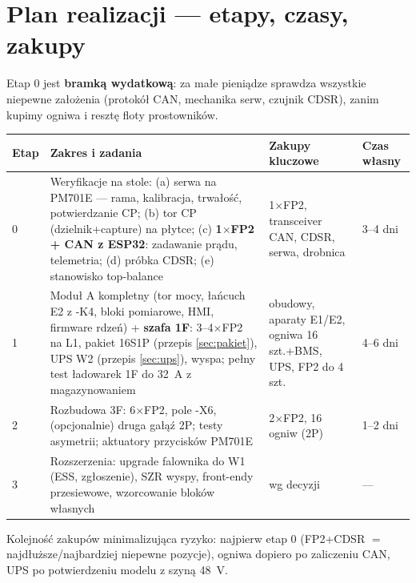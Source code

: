\documentclass[11pt,a4paper]{article}
\begin{document}
\section{Plan realizacji --- etapy, czasy, zakupy}
\label{sec:plan}
Etap 0 jest \textbf{bramką wydatkową}: za małe pieniądze sprawdza wszystkie niepewne założenia
(protokół CAN, mechanika serw, czujnik CDSR), zanim kupimy ogniwa i resztę floty prostowników.
\begin{longtable}{@{}p{}p{}p{}p{}@{}}
\toprule
\textbf{Etap} & \textbf{Zakres i zadania} & \textbf{Zakupy kluczowe} & \textbf{Czas własny}\\
\midrule
0 & Weryfikacje na stole: (a) serwa na PM701E --- rama, kalibracja, trwałość, potwierdzanie CP;
(b) tor CP (dzielnik+capture) na płytce; (c) \textbf{1$\times$FP2 + CAN z ESP32}: zadawanie prądu,
telemetria; (d) próbka CDSR; (e) stanowisko top-balance & 1$\times$FP2, transceiver CAN, CDSR,
serwa, drobnica & 3--4 dni\\
1 & Moduł A kompletny (tor mocy, łańcuch E2 z -K4, bloki pomiarowe, HMI, firmware rdzeń) +
\textbf{szafa 1F}: 3--4$\times$FP2 na L1, pakiet 16S1P (przepis \ref{sec:pakiet}), UPS W2
(przepis \ref{sec:ups}), wyspa; pełny test ładowarek 1F do 32~A z magazynowaniem & obudowy,
aparaty E1/E2, ogniwa 16 szt.+BMS, UPS, FP2 do 4 szt. & 4--6 dni\\
2 & Rozbudowa 3F: 6$\times$FP2, pole -X6, (opcjonalnie) druga gałąź 2P; testy asymetrii;
aktuatory przycisków PM701E & 2$\times$FP2, 16 ogniw (2P) & 1--2 dni\\
3 & Rozszerzenia: upgrade falownika do W1 (ESS, zgłoszenie), SZR wyspy, front-endy przesiewowe,
wzorcowanie bloków własnych & wg decyzji & ---\\
\bottomrule
\end{longtable}
Kolejność zakupów minimalizująca ryzyko: najpierw etap 0 (FP2+CDSR $=$ najdłuższe/najbardziej
niepewne pozycje), ogniwa dopiero po zaliczeniu CAN, UPS po potwierdzeniu modelu z szyną 48~V.
\end{document}
